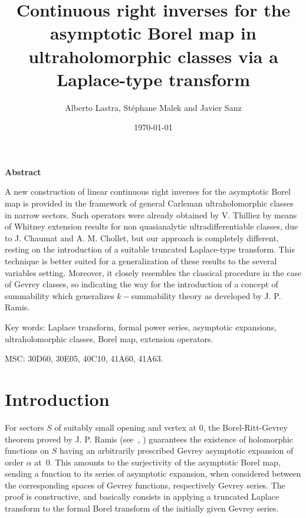 \documentclass[11pt,a4paper,leqno]{article}
\theoremstyle{plain}
\theoremstyle{definition}
\begin{document}
\title{Continuous right inverses for the asymptotic Borel map in ultraholomorphic classes via a Laplace-type transform}
\author{Alberto Lastra, St\'ephane Malek and Javier Sanz}
\date{\today}

\maketitle

{ \small
\begin{center}
{\bf Abstract}
\end{center}
 A new construction of linear continuous right inverses for the asymptotic Borel map is provided in the framework of general Carleman ultraholomorphic classes in narrow sectors. Such operators were already obtained by V. Thilliez by means of Whitney extension results for non quasianalytic ultradifferentiable classes, due to J. Chaumat and A. M. Chollet, but our approach is completely different, resting on the introduction of a suitable truncated Laplace-type transform. This technique is better suited for a generalization of these results to the several variables setting. Moreover, it closely resembles the classical procedure in the case of Gevrey classes, so indicating the way for the introduction of a concept of summability which generalizes $k-$summability theory as developed by J. P. Ramis.

\medskip
\noindent Key words: Laplace transform, formal power series, asymptotic
expansions, ultraholomorphic classes, Borel map, extension operators.\par
{} MSC: 30D60, 30E05, 40C10, 41A60, 41A63.
}

\bigskip \bigskip



\section{Introduction}


\indent\indent For sectors $S$ of suitably small opening and vertex at 0, the Borel-Ritt-Gevrey theorem proved by J. P. Ramis (see~\cite{Ramis1,Ramis2,MartinetRamis}, \cite[Thm.\ 2.2.1]{Balser}) guarantees the existence of holomorphic functions on $S$ having an arbitrarily prescribed Gevrey asymptotic expansion of order $\alpha$ at~0.
This amounts to the surjectivity of the asymptotic Borel map, sending a function to its series of asymptotic expansion,
when considered between the corresponding spaces of Gevrey functions, respectively Gevrey series. The proof is constructive,
and basically consists in applying a truncated Laplace transform to the formal Borel transform of the initially given Gevrey series.
\end{document}

